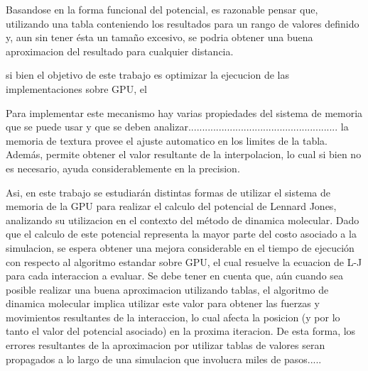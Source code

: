 \documentclass[a4paper,10pt]{report}
\begin{document}
Basandose en la forma funcional del potencial, es razonable pensar que, utilizando una tabla conteniendo los resultados para un rango de valores definido y, aun sin tener ésta un tamaño excesivo, se podria obtener una buena aproximacion del resultado para cualquier distancia. 
 

 
si bien el objetivo de este trabajo es optimizar la ejecucion de las implementaciones sobre GPU, el 


Para implementar este mecanismo hay varias propiedades del sistema de memoria que se puede usar y que se deben analizar......................................................
la memoria de textura provee el ajuste automatico en los limites de la tabla. Además, permite obtener el valor resultante de la interpolacion, lo cual si bien no es necesario, ayuda considerablemente en la precision.




Asi, en este trabajo se estudiarán distintas formas de utilizar el sistema de memoria de la GPU para realizar el calculo del potencial de Lennard Jones, analizando su utilizacion en el contexto del método de dinamica molecular.
Dado que el calculo de este potencial representa la mayor parte del costo asociado a la simulacion, se espera obtener una mejora considerable en el tiempo de ejecución con respecto al algoritmo estandar sobre GPU, el cual resuelve la ecuacion de L-J para cada interaccion a evaluar.
Se debe tener en cuenta que, aún cuando sea posible realizar una buena aproximacion utilizando tablas, el algoritmo de dinamica molecular implica utilizar este valor para obtener las fuerzas y movimientos resultantes de la interaccion, lo cual afecta la posicion (y por lo tanto el valor del potencial asociado) en la proxima iteracion. 
De esta forma, los errores resultantes de la aproximacion por utilizar tablas de valores seran propagados a lo largo de una simulacion que involucra miles de pasos.....
\end{document}
